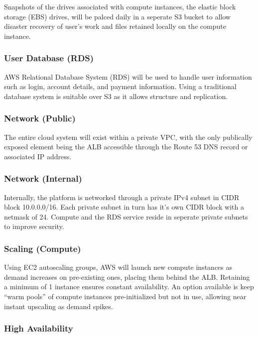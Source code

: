Snapshots of the drives associated with compute instances, the elastic block storage (EBS) drives, will be palced daily in a seperate S3 bucket to allow disaster recovery of user's work and files retained locally on the compute instance.

\subsubsection*{User Database (RDS)}

AWS Relational Database System (RDS) will be used to handle user information such as login, account details, and payment information. Using a traditional database system is suitable over S3 as it allows structure and replication.

\subsubsection*{Network (Public)}

The entire cloud system will exist within a private VPC, with the only publically exposed element being the ALB accessible through the Route 53 DNS record or associated IP address.

\subsubsection*{Network (Internal)}

Internally, the platform is networked through a private IPv4 subnet in CIDR block 10.0.0.0/16. Each private subnet in turn has it's own CIDR block with a netmask of 24. Compute and the RDS service reside in seperate private subnets to improve security.

\subsubsection*{Scaling (Compute)}

Using EC2 autoscaling groups, AWS will launch new compute instances as demand increases on pre-existing ones, placing them behind the ALB. Retaining a minimum of 1 instance ensures constant availability. An option available is keep ``warm pools'' of compute instances pre-initialized but not in use, allowing near instant upscaling as demand spikes.

\subsubsection*{High Availability}


